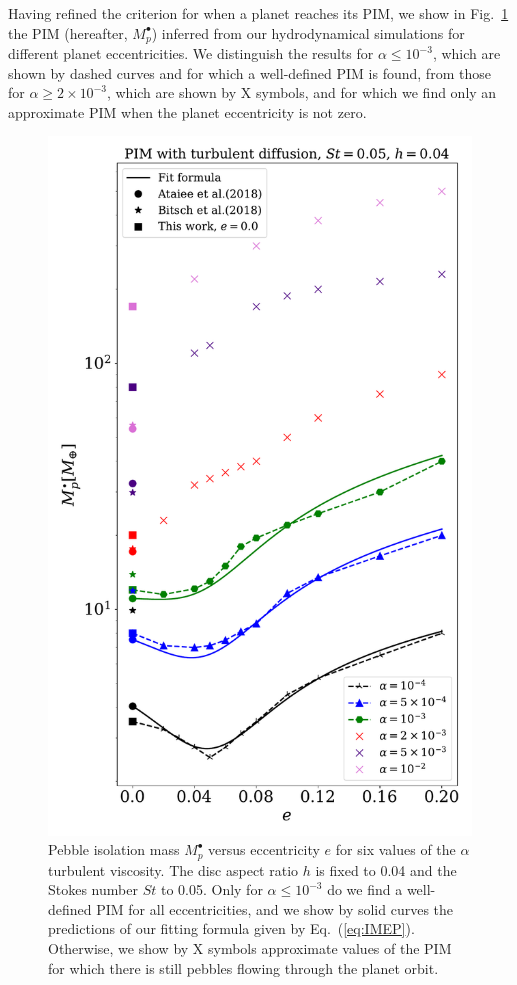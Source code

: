 \documentclass[fleqn,usenatbib]{mnras}
\begin{document}
Having refined the criterion for when a planet reaches its PIM, we show in Fig.~\ref{fig:ecc} the PIM (hereafter, $M_p^{\bullet}$) inferred from our hydrodynamical simulations for different planet eccentricities. We distinguish the results for $\alpha\leq10^{-3}$, which are shown by dashed curves and for which a well-defined PIM is found, from those for $\alpha\geq2\times10^{-3}$, which are shown by X symbols, and for which we find only an approximate PIM when the planet eccentricity is not zero. 
\begin{figure}
	\includegraphics[scale=0.65]{e_vs_Mp_newfit_last.pdf}
    \caption{Pebble isolation mass $M_p^{\bullet}$ versus eccentricity $e$ for six values of the $\alpha$ turbulent viscosity. The disc aspect ratio $h$ is fixed to 0.04 and the Stokes number $St$ to 0.05. Only for $\alpha \leq 10^{-3}$ do we find a well-defined PIM for all eccentricities, and we show by solid curves the predictions of our fitting formula given by Eq.~(\ref{eq:IMEP}). Otherwise, we show by X symbols approximate values of the PIM for which there is still pebbles flowing through the planet orbit.
    }
    \label{fig:ecc}
\end{figure}
\end{document}
